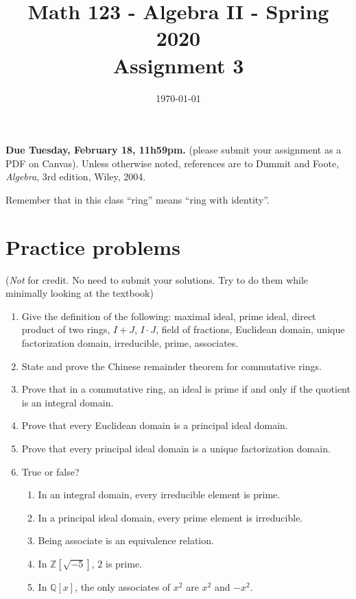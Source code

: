 \documentclass{amsart}
\title[Math 123, Spring 2020: assignment 3]{Math 123 - Algebra II - Spring 2020 \\ Assignment 3}
\date{\today}
\theoremstyle{definition}
\newcommand{\Zz}{\mathbb{Z}}
\newcommand{\Qq}{\mathbb{Q}}
\begin{document}

\vspace*{-10em}
\maketitle

\textbf{Due Tuesday, February 18, 11h59pm.} (please submit your assignment as a PDF on Canvas). Unless otherwise noted, references are to Dummit and Foote, \emph{Algebra}, 3rd edition, Wiley, 2004.

Remember that in this class ``ring'' means ``ring with identity''.

\section*{Practice problems} (\emph{Not} for credit. No need to submit your solutions. Try to do them while minimally looking at the textbook)

\begin{enumerate}
\item Give the definition of the following: maximal ideal, prime ideal, direct product of two rings, $I + J$, $I \cdot J$, field of fractions, Euclidean domain, unique factorization domain, irreducible, prime, associates. 
\item State and prove the Chinese remainder theorem for commutative rings.
\item Prove that in a commutative ring, an ideal is prime if and only if the quotient is an integral domain.
\item Prove that every Euclidean domain is a principal ideal domain.
\item Prove  that every principal ideal domain is a unique factorization domain.
\item True or false?
  \begin{enumerate}
  \item In an integral domain, every irreducible element is prime.
  \item In a principal ideal domain, every prime element is irreducible.
  \item Being associate is an equivalence relation.
  \item In $\Zz[\sqrt{-5}]$, $2$ is prime.
  \item In $\Qq[x]$, the only associates of $x^2$ are $x^2$ and $-x^2$.
  \end{enumerate}
\end{enumerate}
\end{document}
